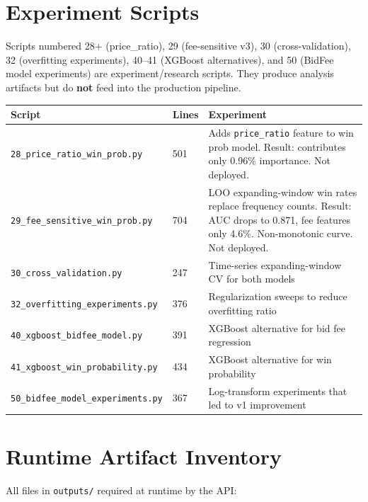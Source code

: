 \documentclass[11pt,a4paper]{article}
\newcommand{\file}[1]{\texttt{\color{gssblue!70!black}#1}}
\begin{document}
\section{Experiment Scripts}
\label{sec:experiments}

Scripts numbered 28+ (price\_ratio), 29 (fee-sensitive v3), 30 (cross-validation),
32 (overfitting experiments), 40--41 (XGBoost alternatives), and 50 (BidFee model
experiments) are experiment/research scripts. They produce analysis artifacts but
do \textbf{not} feed into the production pipeline.

\begin{longtable}{l l p{7cm}}
\toprule
\textbf{Script} & \textbf{Lines} & \textbf{Experiment} \\
\midrule
\endhead
\file{28\_price\_ratio\_win\_prob.py} & 501 & Adds \texttt{price\_ratio} feature to win prob model. Result: contributes only 0.96\% importance. Not deployed. \\
\file{29\_fee\_sensitive\_win\_prob.py} & 704 & LOO expanding-window win rates replace frequency counts. Result: AUC drops to 0.871, fee features only 4.6\%. Non-monotonic curve. Not deployed. \\
\file{30\_cross\_validation.py} & 247 & Time-series expanding-window CV for both models \\
\file{32\_overfitting\_experiments.py} & 376 & Regularization sweeps to reduce overfitting ratio \\
\file{40\_xgboost\_bidfee\_model.py} & 391 & XGBoost alternative for bid fee regression \\
\file{41\_xgboost\_win\_probability.py} & 434 & XGBoost alternative for win probability \\
\file{50\_bidfee\_model\_experiments.py} & 367 & Log-transform experiments that led to v1 improvement \\
\bottomrule
\end{longtable}

\section{Runtime Artifact Inventory}
\label{sec:artifacts}

All files in \file{outputs/} required at runtime by the API:
\end{document}
